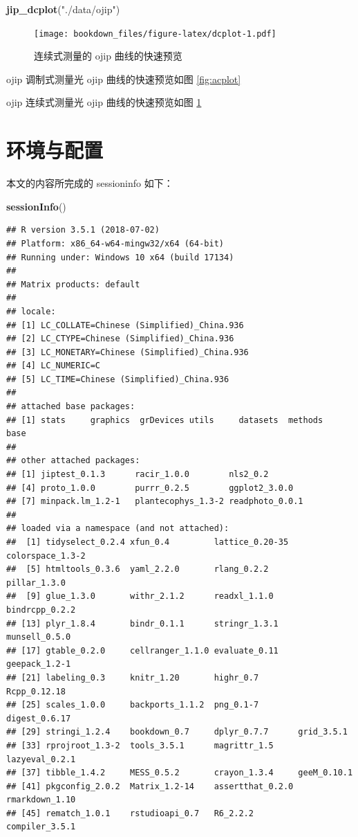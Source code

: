 \documentclass[]{krantz}
\makeatletter
\newenvironment{Shaded}{\begin{snugshade}}{\end{snugshade}}
\newcommand{\KeywordTok}[1]{\textcolor[rgb]{0.13,0.29,0.53}{\textbf{#1}}}
\newcommand{\StringTok}[1]{\textcolor[rgb]{0.31,0.60,0.02}{#1}}
\newcommand{\NormalTok}[1]{#1}
\newenvironment{kframe}{%
\medskip{}
\setlength{\fboxsep}{.8em}
 \def\at@end@of@kframe{}%
 \ifinner\ifhmode%
  \def\at@end@of@kframe{\end{minipage}}%
  \begin{minipage}{\columnwidth}%
 \fi\fi%
 \def\FrameCommand##1{\hskip\@totalleftmargin \hskip-\fboxsep
 \colorbox{shadecolor}{##1}\hskip-\fboxsep
     \hskip-\linewidth \hskip-\@totalleftmargin \hskip\columnwidth}%
 \MakeFramed {\advance\hsize-\width
   \@totalleftmargin\z@ \linewidth\hsize
   \@setminipage}}%
 {\par\unskip\endMakeFramed%
 \at@end@of@kframe}
\renewenvironment{Shaded}{\begin{kframe}}{\end{kframe}}
\theoremstyle{definition}
\theoremstyle{definition}
\theoremstyle{definition}
\theoremstyle{remark}
\makeatother
\begin{document}
\begin{Shaded}
\begin{Highlighting}[]
\KeywordTok{jip_dcplot}\NormalTok{(}\StringTok{"./data/ojip"}\NormalTok{)}
\end{Highlighting}
\end{Shaded}

\begin{figure}
\centering
\texttt{[image: bookdown\_files/figure-latex/dcplot-1.pdf]}
\caption{\label{fig:dcplot}连续式测量的 ojip 曲线的快速预览}
\end{figure}

ojip 调制式测量光 ojip 曲线的快速预览如图 \ref{fig:acplot}

ojip 连续式测量光 ojip 曲线的快速预览如图 \ref{fig:dcplot}

\chapter{环境与配置}\label{sessioninfo}

本文的内容所完成的 sessioninfo 如下：

\begin{Shaded}
\begin{Highlighting}[]
\KeywordTok{sessionInfo}\NormalTok{()}
\end{Highlighting}
\end{Shaded}

\begin{verbatim}
## R version 3.5.1 (2018-07-02)
## Platform: x86_64-w64-mingw32/x64 (64-bit)
## Running under: Windows 10 x64 (build 17134)
## 
## Matrix products: default
## 
## locale:
## [1] LC_COLLATE=Chinese (Simplified)_China.936 
## [2] LC_CTYPE=Chinese (Simplified)_China.936   
## [3] LC_MONETARY=Chinese (Simplified)_China.936
## [4] LC_NUMERIC=C                              
## [5] LC_TIME=Chinese (Simplified)_China.936    
## 
## attached base packages:
## [1] stats     graphics  grDevices utils     datasets  methods   base     
## 
## other attached packages:
## [1] jiptest_0.1.3      racir_1.0.0        nls2_0.2          
## [4] proto_1.0.0        purrr_0.2.5        ggplot2_3.0.0     
## [7] minpack.lm_1.2-1   plantecophys_1.3-2 readphoto_0.0.1   
## 
## loaded via a namespace (and not attached):
##  [1] tidyselect_0.2.4 xfun_0.4         lattice_0.20-35  colorspace_1.3-2
##  [5] htmltools_0.3.6  yaml_2.2.0       rlang_0.2.2      pillar_1.3.0    
##  [9] glue_1.3.0       withr_2.1.2      readxl_1.1.0     bindrcpp_0.2.2  
## [13] plyr_1.8.4       bindr_0.1.1      stringr_1.3.1    munsell_0.5.0   
## [17] gtable_0.2.0     cellranger_1.1.0 evaluate_0.11    geepack_1.2-1   
## [21] labeling_0.3     knitr_1.20       highr_0.7        Rcpp_0.12.18    
## [25] scales_1.0.0     backports_1.1.2  png_0.1-7        digest_0.6.17   
## [29] stringi_1.2.4    bookdown_0.7     dplyr_0.7.7      grid_3.5.1      
## [33] rprojroot_1.3-2  tools_3.5.1      magrittr_1.5     lazyeval_0.2.1  
## [37] tibble_1.4.2     MESS_0.5.2       crayon_1.3.4     geeM_0.10.1     
## [41] pkgconfig_2.0.2  Matrix_1.2-14    assertthat_0.2.0 rmarkdown_1.10  
## [45] rematch_1.0.1    rstudioapi_0.7   R6_2.2.2         compiler_3.5.1
\end{verbatim}

\cleardoublepage



\backmatter
\printindex
\end{document}
